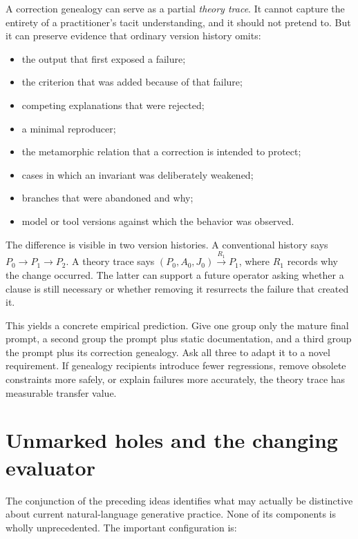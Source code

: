 \documentclass[11pt]{article}
\begin{document}
A correction genealogy can serve as a partial \emph{theory trace}. It cannot capture the entirety of a practitioner's tacit understanding, and it should not pretend to. But it can preserve evidence that ordinary version history omits:

\begin{itemize}
  \item the output that first exposed a failure;
  \item the criterion that was added because of that failure;
  \item competing explanations that were rejected;
  \item a minimal reproducer;
  \item the metamorphic relation that a correction is intended to protect;
  \item cases in which an invariant was deliberately weakened;
  \item branches that were abandoned and why;
  \item model or tool versions against which the behavior was observed.
\end{itemize}

The difference is visible in two version histories. A conventional history says $P_0 \rightarrow P_1 \rightarrow P_2$. A theory trace says $(P_0,A_0,J_0) \xrightarrow{R_1} P_1$, where $R_1$ records why the change occurred. The latter can support a future operator asking whether a clause is still necessary or whether removing it resurrects the failure that created it.

This yields a concrete empirical prediction. Give one group only the mature final prompt, a second group the prompt plus static documentation, and a third group the prompt plus its correction genealogy. Ask all three to adapt it to a novel requirement. If genealogy recipients introduce fewer regressions, remove obsolete constraints more safely, or explain failures more accurately, the theory trace has measurable transfer value.

\section{Unmarked holes and the changing evaluator}

The conjunction of the preceding ideas identifies what may actually be distinctive about current natural-language generative practice. None of its components is wholly unprecedented. The important configuration is:
\end{document}
